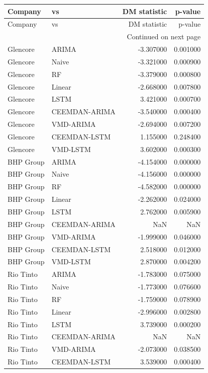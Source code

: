\begin{longtable}{llrr}
\toprule
Company & vs & DM statistic & p-value \\
\midrule
\endfirsthead
\toprule
Company & vs & DM statistic & p-value \\
\midrule
\endhead
\midrule
\multicolumn{4}{r}{Continued on next page} \\
\midrule
\endfoot
\bottomrule
\endlastfoot
Glencore & ARIMA & -3.307000 & 0.001000 \\
Glencore & Naive & -3.321000 & 0.000900 \\
Glencore & RF & -3.379000 & 0.000800 \\
Glencore & Linear & -2.668000 & 0.007800 \\
Glencore & LSTM & 3.421000 & 0.000700 \\
Glencore & CEEMDAN-ARIMA & -3.540000 & 0.000400 \\
Glencore & VMD-ARIMA & -2.694000 & 0.007200 \\
Glencore & CEEMDAN-LSTM & 1.155000 & 0.248400 \\
Glencore & VMD-LSTM & 3.602000 & 0.000300 \\
BHP Group & ARIMA & -4.154000 & 0.000000 \\
BHP Group & Naive & -4.156000 & 0.000000 \\
BHP Group & RF & -4.582000 & 0.000000 \\
BHP Group & Linear & -2.262000 & 0.024000 \\
BHP Group & LSTM & 2.762000 & 0.005900 \\
BHP Group & CEEMDAN-ARIMA & NaN & NaN \\
BHP Group & VMD-ARIMA & -1.999000 & 0.046000 \\
BHP Group & CEEMDAN-LSTM & 2.518000 & 0.012000 \\
BHP Group & VMD-LSTM & 2.870000 & 0.004200 \\
Rio Tinto & ARIMA & -1.783000 & 0.075000 \\
Rio Tinto & Naive & -1.773000 & 0.076600 \\
Rio Tinto & RF & -1.759000 & 0.078900 \\
Rio Tinto & Linear & -2.996000 & 0.002800 \\
Rio Tinto & LSTM & 3.739000 & 0.000200 \\
Rio Tinto & CEEMDAN-ARIMA & NaN & NaN \\
Rio Tinto & VMD-ARIMA & -2.073000 & 0.038500 \\
Rio Tinto & CEEMDAN-LSTM & 3.539000 & 0.000400 \\

\end{longtable}
